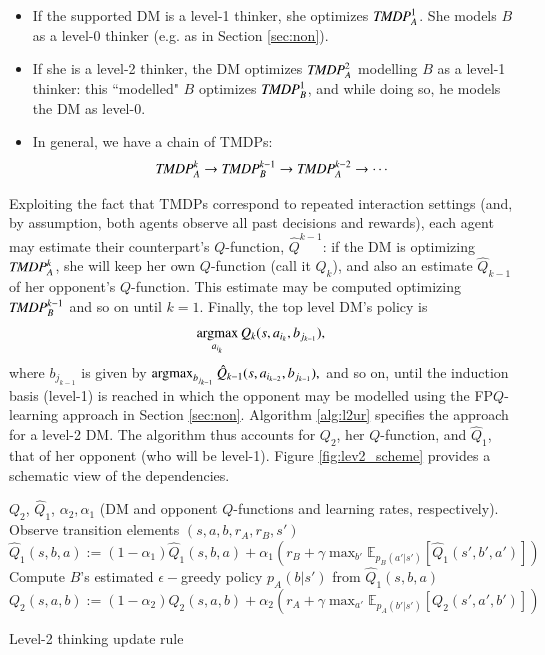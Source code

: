 \begin{itemize}
\item If the supported DM is a level-1 thinker, she optimizes  $ \emph{TMDP}_{A}^1 $. She models $B$ as a level-0 thinker
(e.g. as in Section \ref{sec:non}).
\item If she is a level-2 thinker, the DM optimizes 
$ \emph{TMDP}_{A}^2 $ modelling $B$ as a level-1 thinker:
this ``modelled" $B$ optimizes $ \emph{TMDP}_{B}^1 $, and while doing so,
he models the DM as level-0.%
\item In general, we have a chain of TMDPs:
$$ \emph{TMDP}_{A}^k \rightarrow \emph{TMDP}_{B}^{k-1}
\rightarrow \emph{TMDP}_{A}^{k-2}  \rightarrow \cdots $$
\end{itemize}
Exploiting the fact that TMDPs correspond to repeated interaction settings
(and, by assumption, both agents observe all past
decisions and rewards), each agent may  estimate their
counterpart's $Q$-function, $\hat{Q}^{k-1}$: 
if the DM is optimizing $\emph{TMDP}_A^k$, she will keep her own 
$Q$-function (call it $Q_k$), and also an estimate
$\hat{Q}_{k-1}$ of her opponent's $Q$-function. This estimate may be
computed optimizing $\emph{TMDP}_B^{k-1}$ and so on until $k=1$.
Finally, the top level DM's policy is 
\[
\operatorname*{argmax}_{a_{i_k}} Q_k(s, a_{i_k}, b_{j_{k-1}}),
\]
where $b_{j_{k-1}}$ is given by 
$
\operatorname*{argmax}_{b_{j_{k-1}}} \hat{Q}_{k-1}(s, a_{i_{k-2}}, b_{j_{k-1}}),
$ and so on, until the induction basis (level-1) is reached 
in which the opponent may be modelled using the FP$Q$-learning approach 
in Section \ref{sec:non}.
Algorithm \ref{alg:l2ur} specifies the approach 
for a level-2 DM. 
The algorithm thus accounts for $Q_2$,  her $Q$-function,  and $\hat{Q}_1$,
that of her
opponent (who will be level-1). Figure
\ref{fig:lev2_scheme} provides a schematic view of the dependencies.

\begin{algorithm*}[!ht]
\begin{algorithmic}[1]
\Require $Q_2$, $\hat{Q}_1$, $\alpha_2, \alpha_1$ (DM and opponent $Q$-functions
and learning rates, respectively).
\State Observe  transition elements $(s, a, b, r_A, r_B, s')$ 
\State $\hat{Q}_1(s,b,a) := (1 - \alpha_1)\hat{Q}_1(s,b,a)  + \alpha_1 (r_B + \gamma \max_{b'} \mathbb{E}_{p_B(a'|s')} \left[ \hat{Q}_1(s',b', a') \right] )$ 
\State Compute $B$'s estimated $\epsilon-$greedy policy $p_A(b|s')$ from $\hat{Q}_1(s,b,a)$
\State $Q_2(s,a,b) := (1 - \alpha_2)Q_2(s,a,b) + \alpha_2 (r_A + \gamma \max_{a'} \mathbb{E}_{p_A(b'|s')} \left[ Q_2(s',a',b') \right]) $ 
\end{algorithmic}
\caption{Level-2 thinking update rule}
\label{alg:l2ur}
\end{algorithm*}

